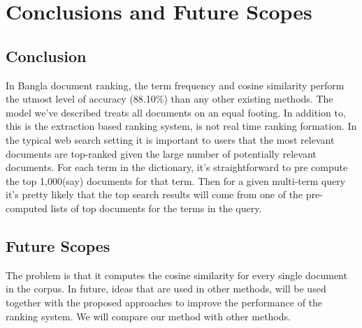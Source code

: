 \chapter{Conclusions and Future Scopes}
\label{Ch_Conclusion}

\section{Conclusion}

In Bangla document ranking, the term frequency and cosine similarity perform the utmost level of accuracy (88.10\%) than any other existing methods. The model we’ve described treats all documents on an equal footing. In addition to, this is the extraction based ranking system, is not real time ranking formation. In the typical web search setting it is important to users that the most relevant documents are top-ranked given the large number of potentially relevant documents. For each term in the dictionary, it’s straightforward to pre compute the top 1,000(say) documents for that term. Then for a given multi-term query it’s pretty likely that the top search results will come from one of the pre-computed lists of top documents for the terms in the query.

\section{Future Scopes}

The problem is that it computes the cosine similarity for every single document in the corpus. In future, ideas that are used in other methods, will be used together with the proposed approaches to improve the performance of the ranking system. We will compare our method with other methods.